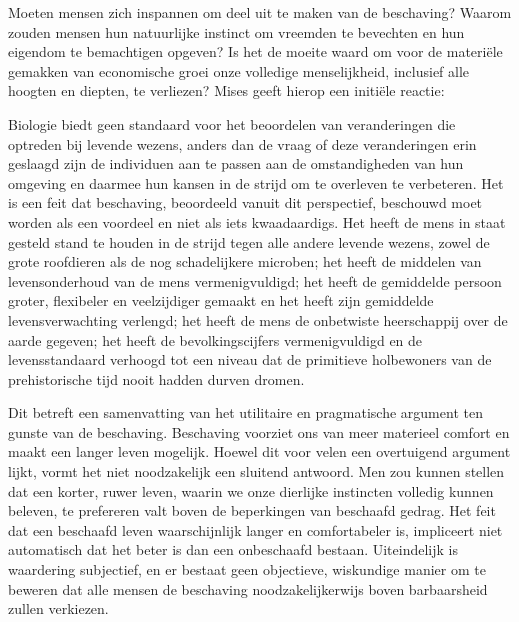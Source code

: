 Moeten mensen zich inspannen om deel uit te maken van de beschaving? Waarom zouden mensen hun natuurlijke instinct om vreemden te bevechten en hun eigendom te bemachtigen opgeven? Is het de moeite waard om voor de materiële gemakken van economische groei onze volledige menselijkheid, inclusief alle hoogten en diepten, te verliezen? Mises geeft hierop een initiële reactie:

\begin{blockquotebox}
Biologie biedt geen standaard voor het beoordelen van veranderingen die optreden bij levende wezens, anders dan de vraag of deze veranderingen erin geslaagd zijn de individuen aan te passen aan de omstandigheden van hun omgeving en daarmee hun kansen in de strijd om te overleven te verbeteren. Het is een feit dat beschaving, beoordeeld vanuit dit perspectief, beschouwd moet worden als een voordeel en niet als iets kwaadaardigs. Het heeft de mens in staat gesteld stand te houden in de strijd tegen alle andere levende wezens, zowel de grote roofdieren als de nog schadelijkere microben; het heeft de middelen van levensonderhoud van de mens vermenigvuldigd; het heeft de gemiddelde persoon groter, flexibeler en veelzijdiger gemaakt en het heeft zijn gemiddelde levensverwachting verlengd; het heeft de mens de onbetwiste heerschappij over de aarde gegeven; het heeft de bevolkingscijfers vermenigvuldigd en de levensstandaard verhoogd tot een niveau dat de primitieve holbewoners van de prehistorische tijd nooit hadden durven dromen.\footnotemark
\end{blockquotebox}

Dit betreft een samenvatting van het utilitaire en pragmatische argument ten gunste van de beschaving. Beschaving voorziet ons van meer materieel comfort en maakt een langer leven mogelijk. Hoewel dit voor velen een overtuigend argument lijkt, vormt het niet noodzakelijk een sluitend antwoord. Men zou kunnen stellen dat een korter, ruwer leven, waarin we onze dierlijke instincten volledig kunnen beleven, te prefereren valt boven de beperkingen van beschaafd gedrag. Het feit dat een beschaafd leven waarschijnlijk langer en comfortabeler is, impliceert niet automatisch dat het beter is dan een onbeschaafd bestaan. Uiteindelijk is waardering subjectief, en er bestaat geen objectieve, wiskundige manier om te beweren dat alle mensen de beschaving noodzakelijkerwijs boven barbaarsheid zullen verkiezen.


